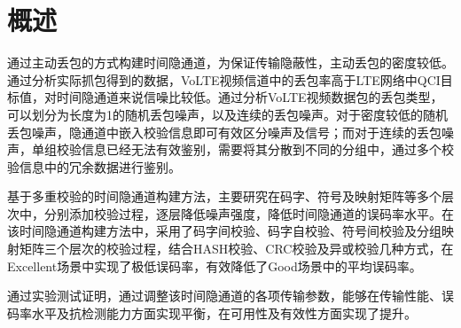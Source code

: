 \section{概述}
\label{chap:hash:overview}

通过主动丢包的方式构建时间隐通道，为保证传输隐蔽性，主动丢包的密度较低。通过分析实际抓包得到的数据，VoLTE视频信道中的丢包率高于LTE网络中QCI目标值，对时间隐通道来说信噪比较低。通过分析VoLTE视频数据包的丢包类型，可以划分为长度为1的随机丢包噪声，以及连续的丢包噪声。对于密度较低的随机丢包噪声，隐通道中嵌入校验信息即可有效区分噪声及信号；而对于连续的丢包噪声，单组校验信息已经无法有效鉴别，需要将其分散到不同的分组中，通过多个校验信息中的冗余数据进行鉴别。

基于多重校验的时间隐通道构建方法，主要研究在码字、符号及映射矩阵等多个层次中，分别添加校验过程，逐层降低噪声强度，降低时间隐通道的误码率水平。在该时间隐通道构建方法中，采用了码字间校验、码字自校验、符号间校验及分组映射矩阵三个层次的校验过程，结合HASH校验、CRC校验及异或校验几种方式，在Excellent场景中实现了极低误码率，有效降低了Good场景中的平均误码率。

通过实验测试证明，通过调整该时间隐通道的各项传输参数，能够在传输性能、误码率水平及抗检测能力方面实现平衡，在可用性及有效性方面实现了提升。